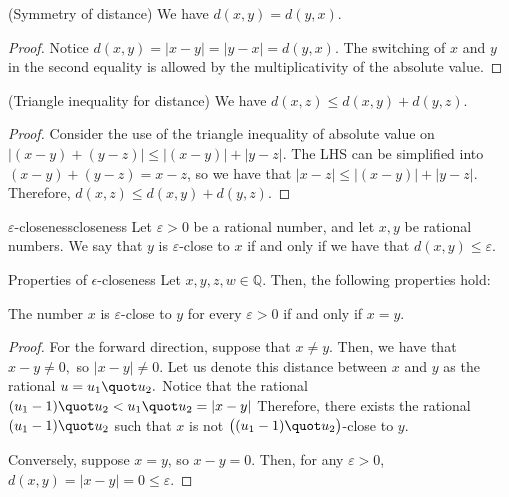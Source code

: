 \begin{proposition}
    (Symmetry of distance) We have $d(x, y) = d(y, x).$
\end{proposition}
\begin{proof}
    Notice $d(x, y) = \lvert x - y \rvert = \lvert y - x \rvert = d(y, x).$ 
    The switching of $x$ and $y$ in the second equality is allowed by the multiplicativity of the absolute value. 
\end{proof}

\begin{proposition}
    (Triangle inequality for distance) We have $d(x, z) \leq d(x, y) + d(y, z).$
\end{proposition}

\begin{proof}
    Consider the use of the triangle inequality of absolute value on $|(x - y) + (y - z)| \leq |(x- y)| + |y - z|$.
    The LHS can be simplified into $(x - y) + (y - z) = x - z$, so we have that $|x - z| \leq |(x- y)| + |y - z|.$
    Therefore, $d(x, z) \leq d(x, y) + d(y, z).$
\end{proof}

\begin{definition}{$\varepsilon$-closeness}{closeness}
    Let $\varepsilon > 0$ be a rational number, and let $x, y$ be rational numbers.
    We say that $y$ is $\varepsilon$-close to $x$ if and only if we have that $d(x, y) \leq \varepsilon.$
\end{definition}
\begin{problem}{Properties of $\epsilon$-closeness}
Let $x, y, z, w \in \mathbb{Q}$. Then, the following properties hold:
\end{problem}
\begin{proposition}
    The number $x$ is $\varepsilon$-close to $y$ for every $\varepsilon > 0$ if and only if  $x = y$.
\end{proposition} 
\begin{proof}
    For the forward direction, suppose that $x \neq y.$
    Then, we have that $x - y \neq 0,$ so $\lvert x - y \rvert \neq 0.$ 
    Let us denote this distance between $x$ and $y$ as the rational $u = u_1 \quot u_2.$
    Notice that the rational $(u_1 - 1) \quot u_2 < u_1 \quot u_2 = \lvert x - y \rvert$
    Therefore, there exists the rational $(u_1 - 1) \quot u_2$ such that $x$ is not $\big( (u_1 - 1) \quot u_2 \big)$-close to $y$. 

    Conversely, suppose $x = y$, so $x - y = 0.$
    Then, for any $\varepsilon > 0$, $d(x, y) = \lvert x - y \rvert = 0 \leq \varepsilon.$
\end{proof}

